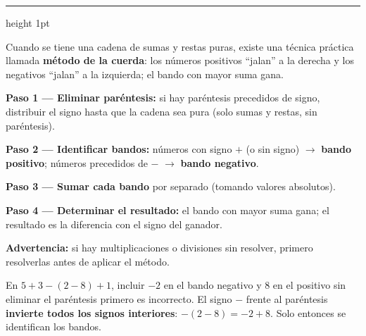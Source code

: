 \documentclass[11pt, letterpaper]{article}
\newcommand{\subbloque}[1]{%
  \vspace{14pt}
  \noindent{\large\bfseries\color{zenitnavy} #1}\par
  \vspace{4pt}\hrule height 1pt\vspace{8pt}}
\begin{document}
\subbloque{2.3 El m\'etodo de la cuerda}
\label{sub:2.3}

Cuando se tiene una cadena de sumas y restas puras, existe una t\'ecnica pr\'actica llamada \textbf{m\'etodo de la cuerda}: los n\'umeros positivos ``jalan'' a la derecha y los negativos ``jalan'' a la izquierda; el bando con mayor suma gana.

\begin{tcolorbox}[importantbox, title={M\'etodo de la cuerda --- procedimiento}]
\textbf{Paso 1 --- Eliminar par\'entesis:} si hay par\'entesis precedidos de signo, distribuir el signo hasta que la cadena sea pura (solo sumas y restas, sin par\'entesis).

\textbf{Paso 2 --- Identificar bandos:} n\'umeros con signo $+$ (o sin signo) $\to$ \textbf{bando positivo}; n\'umeros precedidos de $-$ $\to$ \textbf{bando negativo}.

\textbf{Paso 3 --- Sumar cada bando} por separado (tomando valores absolutos).

\textbf{Paso 4 --- Determinar el resultado:} el bando con mayor suma gana; el resultado es la diferencia con el signo del ganador.

\textbf{Advertencia:} si hay multiplicaciones o divisiones sin resolver, primero resolverlas antes de aplicar el m\'etodo.
\end{tcolorbox}

\begin{tcolorbox}[warningbox, title={Error frecuente --- aplicar el m\'etodo sin eliminar par\'entesis}]
En $5+3-(2-8)+1$, incluir $-2$ en el bando negativo y $8$ en el positivo sin eliminar el par\'entesis primero es incorrecto. El signo $-$ frente al par\'entesis \textbf{invierte todos los signos interiores}: $-(2-8)=-2+8$. Solo entonces se identifican los bandos.
\end{tcolorbox}
\end{document}
